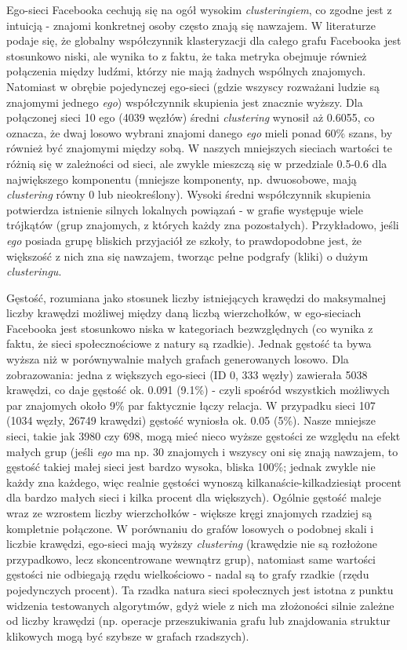 Ego-sieci Facebooka cechują się na ogół wysokim \textit{clusteringiem}, co zgodne jest z intuicją - znajomi konkretnej osoby często znają się nawzajem. W literaturze podaje się, że globalny współczynnik klasteryzacji dla całego grafu Facebooka jest stosunkowo niski, ale wynika to z faktu, że taka metryka obejmuje również połączenia między ludźmi, którzy nie mają żadnych wspólnych znajomych. Natomiast w obrębie pojedynczej ego-sieci (gdzie wszyscy rozważani ludzie są znajomymi jednego \textit{ego}) współczynnik skupienia jest znacznie wyższy. Dla połączonej sieci 10 ego (4039 węzłów) średni \textit{clustering} wynosił aż 0.6055, co oznacza, że dwaj losowo wybrani znajomi danego \textit{ego} mieli ponad 60\% szans, by również być znajomymi między sobą. W naszych mniejszych sieciach wartości te różnią się w zależności od sieci, ale zwykle mieszczą się w przedziale 0.5-0.6 dla największego komponentu (mniejsze komponenty, np. dwuosobowe, mają \textit{clustering} równy 0 lub nieokreślony). Wysoki średni współczynnik skupienia potwierdza istnienie silnych lokalnych powiązań - w grafie występuje wiele trójkątów (grup znajomych, z których każdy zna pozostałych). Przykładowo, jeśli \textit{ego} posiada grupę bliskich przyjaciół ze szkoły, to prawdopodobne jest, że większość z nich zna się nawzajem, tworząc pełne podgrafy (kliki) o dużym \textit{clusteringu}.

Gęstość, rozumiana jako stosunek liczby istniejących krawędzi do maksymalnej liczby krawędzi możliwej między daną liczbą wierzchołków, w ego-sieciach Facebooka jest stosunkowo niska w kategoriach bezwzględnych (co wynika z faktu, że sieci społecznościowe z natury są rzadkie). Jednak gęstość ta bywa wyższa niż w porównywalnie małych grafach generowanych losowo. Dla zobrazowania: jedna z większych ego-sieci (ID 0, 333 węzły) zawierała 5038 krawędzi, co daje gęstość ok. 0.091 (9.1\%) - czyli spośród wszystkich możliwych par znajomych około 9\% par faktycznie łączy relacja. W przypadku sieci 107 (1034 węzły, 26749 krawędzi) gęstość wyniosła ok. 0.05 (5\%). Nasze mniejsze sieci, takie jak 3980 czy 698, mogą mieć nieco wyższe gęstości ze względu na efekt małych grup (jeśli \textit{ego} ma np. 30 znajomych i wszyscy oni się znają nawzajem, to gęstość takiej małej sieci jest bardzo wysoka, bliska 100\%; jednak zwykle nie każdy zna każdego, więc realnie gęstości wynoszą kilkanaście-kilkadziesiąt procent dla bardzo małych sieci i kilka procent dla większych). Ogólnie gęstość maleje wraz ze wzrostem liczby wierzchołków - większe kręgi znajomych rzadziej są kompletnie połączone. W porównaniu do grafów losowych o podobnej skali i liczbie krawędzi, ego-sieci mają wyższy \textit{clustering} (krawędzie nie są rozłożone przypadkowo, lecz skoncentrowane wewnątrz grup), natomiast same wartości gęstości nie odbiegają rzędu wielkościowo - nadal są to grafy rzadkie (rzędu pojedynczych procent). Ta rzadka natura sieci społecznych jest istotna z punktu widzenia testowanych algorytmów, gdyż wiele z nich ma złożoności silnie zależne od liczby krawędzi (np. operacje przeszukiwania grafu lub znajdowania struktur klikowych mogą być szybsze w grafach rzadszych).

